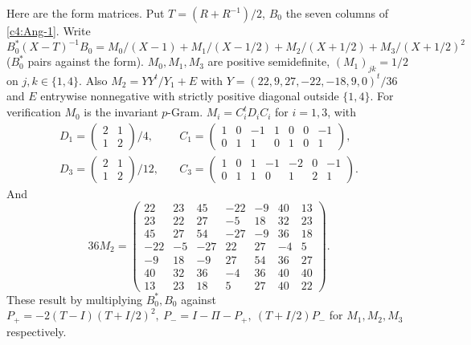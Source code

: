 Here are the form matrices. Put \(T=(R+R^{-1})/2\), \(B_0\) the seven columns of \eqref{c4:Ang-1}. Write
\[
 B_0^*(X-T)^{-1}B_0
 = M_0/(X-1)+M_1/(X-1/2)+M_2/(X+1/2)+M_3/(X+1/2)^2
\]
(\(B_0^*\) pairs against the form). \(M_0,M_1,M_3\) are positive semidefinite, \((M_1)_{jk}=1/2\) on \(j,k\in\{1,4\}\). Also \(M_2=Y Y^t/Y_1+E\) with \(Y=(22,9,27,-22,-18,9,0)^t/36\) and \(E\) entrywise nonnegative with strictly positive diagonal outside \(\{1,4\}\). For verification \(M_0\) is the invariant \(p\)-Gram. \(M_i=C_i^t D_i C_i\) for \(i=1,3\), with
\[
 \begin{split}
 D_1=\begin{pmatrix}2&1\\1&2\end{pmatrix}/4,&\quad
 C_1=\begin{pmatrix}1&0&-1&1&0&0&-1\\0&1&1&0&1&0&1\end{pmatrix},\\
 D_3=\begin{pmatrix}2&1\\1&2\end{pmatrix}/12,&\quad
 C_3=\begin{pmatrix}1&0&1&-1&-2&0&-1\\0&1&1&0&1&2&1\end{pmatrix}.
 \end{split}
\]
And
\[
 36M_2=\begin{pmatrix}
22&23&45&-22&-9&40&13\\23&22&27&-5&18&32&23\\45&27&54&-27&-9&36&18\\
-22&-5&-27&22&27&-4&5\\-9&18&-9&27&54&36&27\\40&32&36&-4&36&40&40\\13&23&18&5&27&40&22
 \end{pmatrix}.
\]
These result by multiplying \(B_0^*,B_0\) against \(P_+=-2(T-I)(T+I/2)^2,\ P_-=I-\Pi-P_+,\ (T+I/2)P_-\) for \(M_1,M_2,M_3\) respectively.

